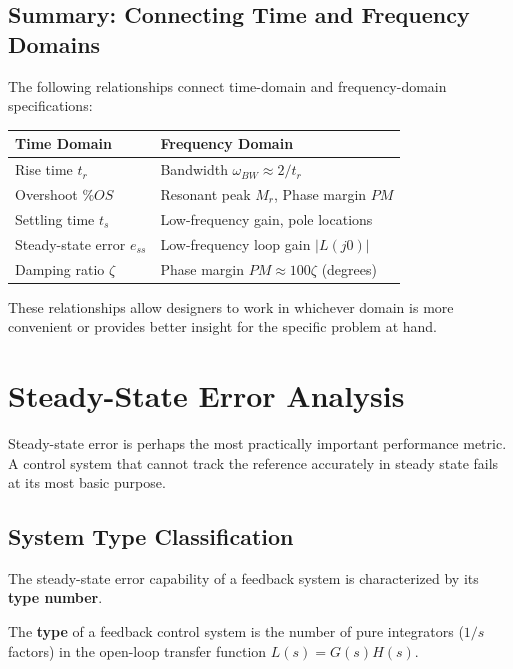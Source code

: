 \subsection{Summary: Connecting Time and Frequency Domains}

The following relationships connect time-domain and frequency-domain specifications:

\begin{center}
\begin{tabular}{ll}
\toprule
\textbf{Time Domain} & \textbf{Frequency Domain} \\
\midrule
Rise time $t_r$ & Bandwidth $\omega_{BW} \approx 2/t_r$ \\
Overshoot $\%OS$ & Resonant peak $M_r$, Phase margin $PM$ \\
Settling time $t_s$ & Low-frequency gain, pole locations \\
Steady-state error $e_{ss}$ & Low-frequency loop gain $|L(j0)|$ \\
Damping ratio $\zeta$ & Phase margin $PM \approx 100\zeta$ (degrees) \\
\bottomrule
\end{tabular}
\end{center}

These relationships allow designers to work in whichever domain is more convenient or provides better insight for the specific problem at hand.


\section{Steady-State Error Analysis}
\label{sec:steady_state_error_analysis}

Steady-state error is perhaps the most practically important performance metric. A control system that cannot track the reference accurately in steady state fails at its most basic purpose.

\subsection{System Type Classification}

The steady-state error capability of a feedback system is characterized by its \textbf{type number}.

\begin{definition}
The \textbf{type} of a feedback control system is the number of pure integrators ($1/s$ factors) in the open-loop transfer function $L(s) = G(s)H(s)$.
\end{definition}

